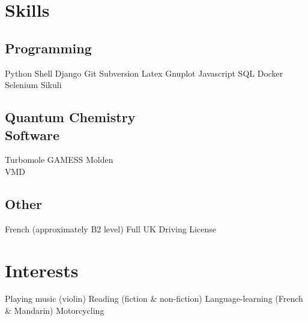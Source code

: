 \documentclass[letterpaper]{deedy-resume-openfont} %
\begin{document}
\begin{minipage}[t]{0.33\textwidth}
\sectionspace %


\section{Skills}

\subsection{Programming}

Python \textbullet{} Shell \textbullet{} Django \textbullet{} Git \textbullet{} Subversion \textbullet{} Latex \textbullet{} Gnuplot \textbullet{} Javascript \textbullet{} SQL \textbullet{} Docker \textbullet{} Selenium \textbullet{} Sikuli

\sectionspace %

\subsection[]{Quantum Chemistry \\ Software}

Turbomole \textbullet{} GAMESS \textbullet{} Molden \\
\textbullet{} VMD 

\sectionspace %

\subsection[]{Other}

French (approximately B2 level) \textbullet{} Full UK Driving License

\sectionspace %

\section{Interests}

Playing music (violin) \textbullet{} Reading (fiction \& non-fiction) \textbullet{} Language-learning (French \& Mandarin) \textbullet{} Motorcycling \\


\end{minipage} %
\end{document}
